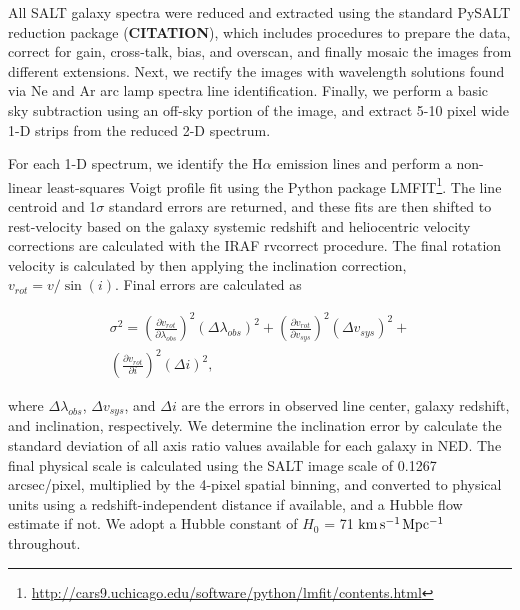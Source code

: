 \documentclass[iop]{emulateapj-rtx4}
\newcommand{\kms}{$\rm km\, s^{-1}$}
\begin{document}


All SALT galaxy spectra were reduced and extracted using the standard PySALT reduction package (\textbf{CITATION}), which includes procedures to prepare the data, correct for gain, cross-talk, bias, and overscan, and finally mosaic the images from different extensions. Next, we rectify the images with wavelength solutions found via Ne and Ar arc lamp spectra line identification. Finally, we perform a basic sky subtraction using an off-sky portion of the image, and extract 5-10 pixel wide 1-D strips from the reduced 2-D spectrum. 

For each 1-D spectrum, we identify the H$\alpha$ emission lines and perform a non-linear least-squares Voigt profile fit using the Python package LMFIT\footnote{\url{http://cars9.uchicago.edu/software/python/lmfit/contents.html}}. The line centroid and 1$\sigma$ standard errors are returned, and these fits are then shifted to rest-velocity based on the galaxy systemic redshift and heliocentric velocity corrections are calculated with the IRAF rvcorrect procedure. The final rotation velocity is calculated by then applying the inclination correction, $v_{rot} = v / \sin(i)$. Final errors are calculated as

\begin{equation}
\begin{split}
	\sigma^2 = \left( \frac{\partial v_{rot}}{\partial \lambda_{obs}} \right)^2 (\Delta \lambda_{obs})^2 + \left(\frac{\partial v_{rot}}{\partial v_{sys}} \right)^2 (\Delta v_{sys})^2 + \\
	\left( \frac{\partial v_{rot}}{\partial i} \right)^2 (\Delta i)^2,
\end{split}
\end{equation}

\noindent where $\Delta \lambda_{obs}$, $\Delta v_{sys}$, and $\Delta i$ are the errors in observed line center, galaxy redshift, and inclination, respectively. We determine the inclination error by calculate the standard deviation of all axis ratio values available for each galaxy in NED. The final physical scale is calculated using the SALT image scale of 0.1267 arcsec/pixel, multiplied by the 4-pixel spatial binning, and converted to physical units using a redshift-independent distance if available, and a Hubble flow estimate if not. We adopt a Hubble constant of $H_0$ = 71 \kms $\rm Mpc^{-1}$ throughout.
\end{document}
